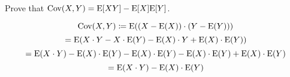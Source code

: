 \question Prove that $\text{Cov}(X, Y) = \text{E}[XY] - \text{E}[X]\text{E}[Y]$. 
\begin{solution}[1 cm]
	\[\text{Cov}(X, Y) \coloneqq \text{E} ((X - \text{E}(X)) \cdot (Y - \text{E}(Y)))\]
	\[ = \text{E} (X \cdot Y - X \cdot \text{E}(Y) - \text{E}(X) \cdot Y + \text{E}(X) \cdot \text{E}(Y)) \]
	\[ = \text{E} (X \cdot Y) - \text{E}(X) \cdot \text{E}(Y) - \text{E}(X) \cdot \text{E}(Y) - \text{E}(X) \cdot \text{E}(Y) + \text{E}(X) \cdot \text{E}(Y) \]
	\[ = \text{E} (X \cdot Y) - \text{E}(X) \cdot \text{E}(Y) \]
\end{solution}